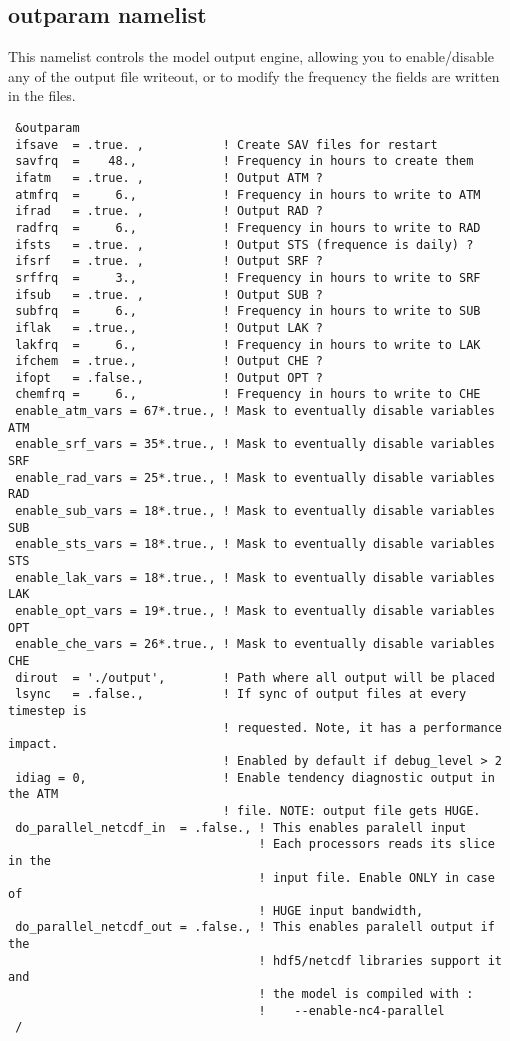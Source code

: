 \subsection{outparam namelist}

This namelist controls the model output engine, allowing you to enable/disable
any of the output file writeout, or to modify the frequency the fields are
written in the files.

{\footnotesize
\begin{Verbatim}
 &outparam
 ifsave  = .true. ,           ! Create SAV files for restart
 savfrq  =    48.,            ! Frequency in hours to create them
 ifatm   = .true. ,           ! Output ATM ?
 atmfrq  =     6.,            ! Frequency in hours to write to ATM
 ifrad   = .true. ,           ! Output RAD ?
 radfrq  =     6.,            ! Frequency in hours to write to RAD
 ifsts   = .true. ,           ! Output STS (frequence is daily) ?
 ifsrf   = .true. ,           ! Output SRF ?
 srffrq  =     3.,            ! Frequency in hours to write to SRF
 ifsub   = .true. ,           ! Output SUB ?
 subfrq  =     6.,            ! Frequency in hours to write to SUB
 iflak   = .true.,            ! Output LAK ?
 lakfrq  =     6.,            ! Frequency in hours to write to LAK
 ifchem  = .true.,            ! Output CHE ?
 ifopt   = .false.,           ! Output OPT ?
 chemfrq =     6.,            ! Frequency in hours to write to CHE
 enable_atm_vars = 67*.true., ! Mask to eventually disable variables ATM
 enable_srf_vars = 35*.true., ! Mask to eventually disable variables SRF
 enable_rad_vars = 25*.true., ! Mask to eventually disable variables RAD
 enable_sub_vars = 18*.true., ! Mask to eventually disable variables SUB
 enable_sts_vars = 18*.true., ! Mask to eventually disable variables STS
 enable_lak_vars = 18*.true., ! Mask to eventually disable variables LAK
 enable_opt_vars = 19*.true., ! Mask to eventually disable variables OPT
 enable_che_vars = 26*.true., ! Mask to eventually disable variables CHE
 dirout  = './output',        ! Path where all output will be placed
 lsync   = .false.,           ! If sync of output files at every timestep is
                              ! requested. Note, it has a performance impact.
                              ! Enabled by default if debug_level > 2
 idiag = 0,                   ! Enable tendency diagnostic output in the ATM
                              ! file. NOTE: output file gets HUGE.
 do_parallel_netcdf_in  = .false., ! This enables paralell input
                                   ! Each processors reads its slice in the
                                   ! input file. Enable ONLY in case of
                                   ! HUGE input bandwidth,
 do_parallel_netcdf_out = .false., ! This enables paralell output if the 
                                   ! hdf5/netcdf libraries support it and
                                   ! the model is compiled with :
                                   !    --enable-nc4-parallel
 /
\end{Verbatim}
}

